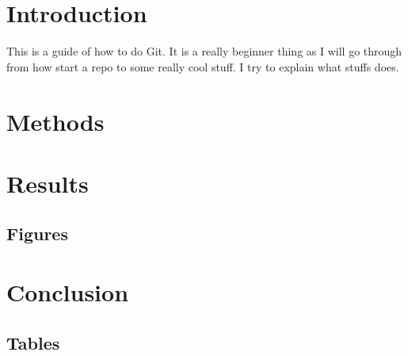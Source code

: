 \documentclass[12pt]{article} %
\begin{document}
\newpage
\tableofcontents

\newpage
\listoffigures

\newpage
\listoftables

\newpage
{}
\setcounter{page}{1}


\section*{Introduction}
This is a guide of how to do Git. It is a really beginner thing as I will go through from how start a repo to some really cool stuff. I try to explain what stuffs does. 

\section*{Methods} %

\section*{Results} %

\subsection*{Figures} %

\section*{Conclusion} %

\subsection*{Tables} %
\end{document}
